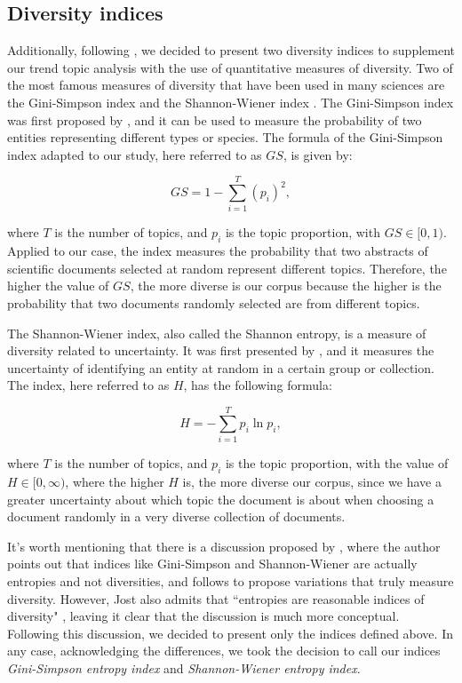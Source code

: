 \subsection{Diversity indices} \label{diversity_indices}

Additionally, following \cite{pisarevskaya_mapping_2020}, we decided to present two diversity indices to supplement our trend topic analysis with the use of quantitative measures of diversity. Two of the most famous measures of diversity that have been used in many sciences are the Gini-Simpson index and the Shannon-Wiener index \citep{jost_entropy_2006}. The Gini-Simpson index was first proposed by \cite{simpson_measurement_1949}, and it can be used to measure the probability of two entities representing different types or species. The formula of the Gini-Simpson index adapted to our study, here referred to as $GS$, is given by:

\begin{equation}
GS = 1 - \sum^{T}_{i = 1} (p_{i})^{2},
\label{gs_entropy}
\end{equation}

\noindent where $T$ is the number of topics, and $p_{i}$ is the topic proportion, with $GS \in [0,1)$. Applied to our case, the index measures the probability that two abstracts of scientific documents selected at random represent different topics. Therefore, the higher the value of $GS$, the more diverse is our corpus because the higher is the probability that two documents randomly selected are from different topics.

The Shannon-Wiener index, also called the Shannon entropy, is a measure of diversity related to uncertainty. It was first presented by \cite{shannon_mathematical_1948}, and it measures the uncertainty of identifying an entity at random in a certain group or collection. The index, here referred to as $H$, has the following formula:

\begin{equation}
H = - \sum^{T}_{i = 1} p_{i} \ln{p_{i}},
\label{h_entropy}
\end{equation}

\noindent where $T$ is the number of topics, and $p_{i}$ is the topic proportion, with the value of $H \in [0, \infty)$, where the higher $H$ is, the more diverse our corpus, since we have a greater uncertainty about which topic the document is about when choosing a document randomly in a very diverse collection of documents.

It's worth mentioning that there is a discussion proposed by \cite{jost_entropy_2006}, where the author points out that indices like Gini-Simpson and Shannon-Wiener are actually entropies and not diversities, and follows to propose variations that truly measure diversity. However, Jost also admits that ``entropies are reasonable indices of diversity" \citep[p. 363]{jost_entropy_2006}, leaving it clear that the discussion is much more conceptual. Following this discussion, we decided to present only the indices defined above. In any case, acknowledging the differences, we took the decision to call our indices \textit{Gini-Simpson entropy index} and \textit{Shannon-Wiener entropy index}.